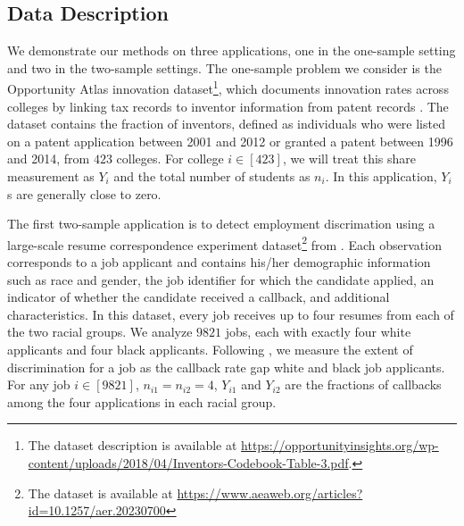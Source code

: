 \documentclass[12pt,letterpaper]{article}
\begin{document}
\subsection{Data Description}
We demonstrate our methods on three applications, one in the one-sample setting and two in the two-sample settings. The one-sample problem we consider is the Opportunity Atlas innovation dataset\footnote{The dataset description is available at \url{https://opportunityinsights.org/wp-content/uploads/2018/04/Inventors-Codebook-Table-3.pdf}.}, which documents innovation rates across colleges by linking tax records to inventor information from patent records \citep{bell2019becomes}. 
The dataset contains the fraction of inventors, defined as individuals who were listed on a patent application between 2001 and 2012 or granted a patent between 1996 and 2014, from $423$ colleges. For college $i\in [423]$, we will treat this share measurement as $Y_i$ and the total number of students as $n_i$. In this application, $Y_i$s are generally close to zero.

 

The first two-sample application is to detect employment discrimation using a large-scale resume correspondence experiment dataset\footnote{The dataset is available at 
 \url{https://www.aeaweb.org/articles?id=10.1257/aer.20230700}} from \citet{kline2022systemic}. Each observation corresponds to a job applicant and contains his/her demographic information such as race and gender, the job identifier for which the candidate applied, an indicator of whether the candidate received a callback, and additional characteristics. In this dataset, every job receives up to four resumes from each of the two racial groups. We analyze $9821$ jobs, each with exactly four white applicants and four black applicants. Following \cite{kline2021reasonable, kline2022systemic, kline2024discrimination}, we measure the extent of discrimination for a job as the callback rate gap white and black job applicants. For any job $i\in [9821]$, $n_{i1} = n_{i2} = 4$,  $Y_{i1}$ and $Y_{i2}$ are the fractions of callbacks among the four applications in each racial group.
 
\end{document}
